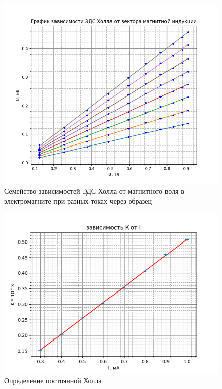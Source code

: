 \documentclass[a4paper]{article}
\begin{document}
\begin{figure}[h]
    \centering
    \includegraphics[width=\textwidth]{hall-dependency.png}
    \caption{Семейство зависимостей ЭДС Холла от магнитного воля в электромагните при разных токах через образец}
    \label{fig:vac}
\end{figure}
\par

\FloatBarrier

\begin{figure}[h]
    \centering
    \includegraphics[width=15cm]{k-dependency.png}
    \caption{Определение постоянной Холла}
    \label{fig:k-dep}
\end{figure}
\end{document}
